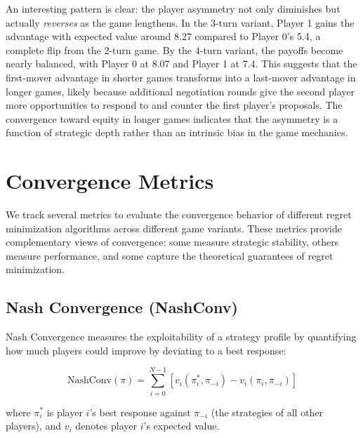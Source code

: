 \documentclass[11pt]{article}
\begin{document}
An interesting pattern is clear: the player asymmetry not only diminishes but actually \textit{reverses} as the game lengthens. In the 3-turn variant, Player 1 gains the advantage with expected value around 8.27 compared to Player 0's 5.4, a complete flip from the 2-turn game. By the 4-turn variant, the payoffs become nearly balanced, with Player 0 at 8.07 and Player 1 at 7.4. This suggests that the first-mover advantage in shorter games transforms into a last-mover advantage in longer games, likely because additional negotiation rounds give the second player more opportunities to respond to and counter the first player's proposals. The convergence toward equity in longer games indicates that the asymmetry is a function of strategic depth rather than an intrinsic bias in the game mechanics.














\section{Convergence Metrics}

We track several metrics to evaluate the convergence behavior of different regret minimization algorithms across different game variants. These metrics provide complementary views of convergence: some measure strategic stability, others measure performance, and some capture the theoretical guarantees of regret minimization.




\subsection{Nash Convergence (NashConv)}

Nash Convergence measures the exploitability of a strategy profile by quantifying how much players could improve by deviating to a best response:

\begin{equation}
\text{NashConv}(\pi) = \sum_{i=0}^{N-1} \left[ v_i(\pi_i^*, \pi_{-i}) - v_i(\pi_i, \pi_{-i}) \right]
\end{equation}

where $\pi_i^*$ is player $i$'s best response against $\pi_{-i}$ (the strategies of all other players), and $v_i$ denotes player $i$'s expected value.
\end{document}
